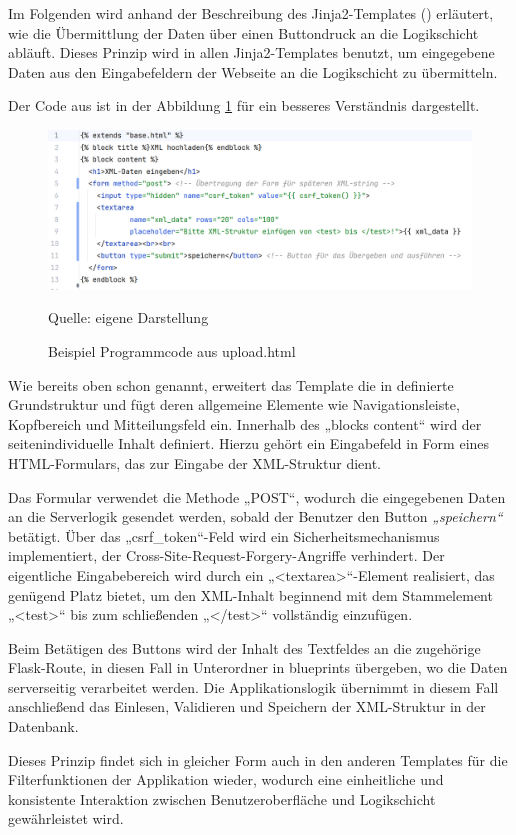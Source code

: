 Im Folgenden wird anhand der Beschreibung des
Jinja2-Templates () erläutert, wie die Übermittlung der Daten
über einen Buttondruck an die Logikschicht abläuft. Dieses Prinzip wird in
allen Jinja2-Templates benutzt, um eingegebene Daten aus den Eingabefeldern der
Webseite an die Logikschicht zu übermitteln.


Der Code aus  ist in der Abbildung \ref{fig: Programmcode aus upload.html} für ein besseres Verständnis dargestellt.

\begin{figure}[H]
    \centering
    \includegraphics[width=1\textwidth]{Grafiken/Beispiel Programmcode aus upload.html}
    \caption{Beispiel Programmcode aus upload.html}
    \label{fig: Programmcode aus upload.html}
    {Quelle: eigene Darstellung}
\end{figure}

Wie bereits oben schon genannt, erweitert das Template die
in  definierte Grundstruktur und fügt deren allgemeine Elemente
wie Navigationsleiste, Kopfbereich und Mitteilungsfeld ein. Innerhalb des „blocks
content“ wird der seitenindividuelle Inhalt definiert. Hierzu gehört ein
Eingabefeld in Form eines HTML-Formulars, das zur Eingabe der XML-Struktur
dient.

Das Formular verwendet die Methode „POST“, wodurch die
eingegebenen Daten an die Serverlogik gesendet werden, sobald der Benutzer den
Button \textit{„speichern“} betätigt. Über das „csrf\_token“-Feld wird ein
Sicherheitsmechanismus implementiert, der Cross-Site-Request-Forgery-Angriffe
verhindert. Der eigentliche Eingabebereich wird durch ein „<textarea>“-Element
realisiert, das genügend Platz bietet, um den XML-Inhalt beginnend mit dem
Stammelement „<test>“ bis zum schließenden „</test>“ vollständig
einzufügen.

Beim Betätigen des Buttons wird der Inhalt des Textfeldes an
die zugehörige Flask-Route, in diesen Fall  in Unterordner 
in blueprints übergeben, wo die Daten serverseitig verarbeitet werden.
Die Applikationslogik übernimmt in diesem Fall anschließend das Einlesen, Validieren und Speichern
der XML-Struktur in der Datenbank.

Dieses Prinzip findet sich in gleicher Form auch in den
anderen Templates für die Filterfunktionen der Applikation wieder, wodurch eine einheitliche und
konsistente Interaktion zwischen Benutzeroberfläche und Logikschicht
gewährleistet wird.









